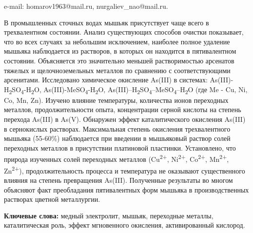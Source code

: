 e-mail: homarov1963@mail.ru, nurgaliev\_nao@mail.ru.

В промышленных сточных водах мышьяк присутствует чаще всего в
трехвалентном состоянии. Анализ существующих способов очистки
показывает, что во всех случаях за небольшим исключением, наиболее
полное удаление мышьяка наблюдается из растворов, в которых он находится
в пятивалентном состоянии. Объясняется это значительно меньшей
растворимостью арсенатов тяжелых и щелочноземельных металлов по
сравнению с соответствующими арсенитами. Исследовано химическое
окисление As(III) в системах:
As(III)-H\textsubscript{2}SO\textsubscript{4}-H\textsubscript{2}O,
As(III)-MeSO\textsubscript{4}-H\textsubscript{2}O,
As(III)--H\textsubscript{2}SO\textsubscript{4}--MeSO\textsubscript{4}--H\textsubscript{2}O
(где Me - Cu, Ni, Co, Mn, Zn). Изучено влияние температуры, количества
ионов переходных металлов, продолжительности опыта, концентрации серной
кислоты на степень перехода As(III) в As(V). Обнаружен эффект
каталитического окисления As(III) в сернокислых растворах. Максимальная
степень окисления трехвалентного мышьяка (55-60\%) наблюдается при
введении в мышьяковый раствор солей переходных металлов в присутствии
платиновой пластинки. Установлено, что природа изученных солей
переходных металлов (Cu\textsuperscript{2+}, Ni\textsuperscript{2+},
Co\textsuperscript{2+}, Mn\textsuperscript{2+}, Zn\textsuperscript{2+}),
продолжительность процесса и температура не оказывают существенного
влияния на степень превращения As(III). Полученные результаты во многом
объясняют факт преобладания пятивалентных форм мышьяка в
производственных растворах цветной металлургии.

{\bfseries Ключевые слова:} медный электролит, мышьяк, переходные металлы,
каталитическая роль, эффект мгновенного окисления, активированный
кислород.


